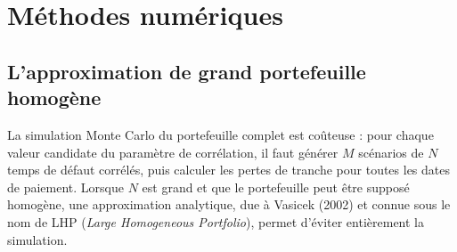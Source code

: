 \section{Méthodes numériques}
\label{sec:methodes_numeriques}

\subsection{L'approximation de grand portefeuille homogène}


La simulation Monte Carlo du portefeuille complet est coûteuse : pour chaque valeur candidate
du paramètre de corrélation, il faut générer $M$ scénarios de $N$ temps de défaut corrélés, puis
calculer les pertes de tranche pour toutes les dates de paiement. Lorsque $N$ est grand et que le
portefeuille peut être supposé homogène, une approximation analytique, due à Vasicek (2002) et
connue sous le nom de LHP (\emph{Large Homogeneous Portfolio}), permet d'éviter entièrement
la simulation.


